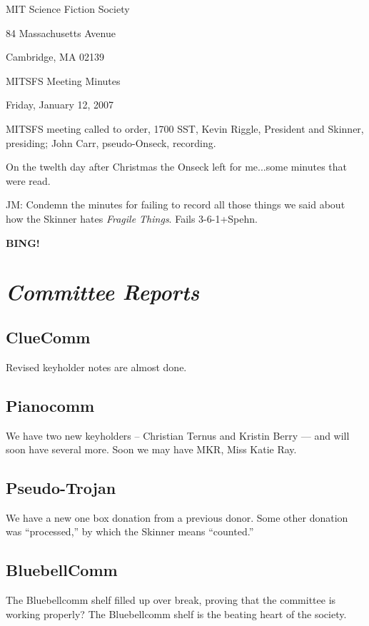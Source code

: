 \documentclass[10pt]{article}
\newcommand{\bing}{{\bf BING!} }
\newcommand{\goto}[1]{\bing \vskip 12pt \section*{{\em{#1}}}}
\begin{document}
\begin{center}

MIT Science Fiction Society

84 Massachusetts Avenue

Cambridge, MA 02139

\vspace{12pt}

MITSFS Meeting Minutes

Friday, January 12, 2007

\end{center}

\vspace{18pt}

\setlength{\parskip}{6pt}

\noindent
MITSFS meeting called to order, 1700 SST,
Kevin Riggle, President and Skinner, presiding; John Carr, pseudo-Onseck, recording.

On the twelth day after Christmas the Onseck left for me...some minutes
that were read.

JM: Condemn the minutes for failing to record all those things we said about
how the Skinner hates {\em Fragile Things}.
Fails \hbox{3-6-1+Spehn}.

\goto{Committee Reports}

\subsection*{ClueComm}
Revised keyholder notes are almost done.

\subsection*{Pianocomm}
We have two new keyholders -- Christian Ternus and Kristin Berry --- and will
soon have several more.  Soon we may have MKR, Miss Katie Ray.

\subsection*{Pseudo-Trojan}
We have a new one box donation from a previous donor.
Some other donation was ``processed,'' by which the Skinner
means ``counted.''

\subsection*{BluebellComm}
The Bluebellcomm shelf filled up over break, proving that the
committee is working properly?
The Bluebellcomm shelf is the beating heart of the society.
\end{document}
